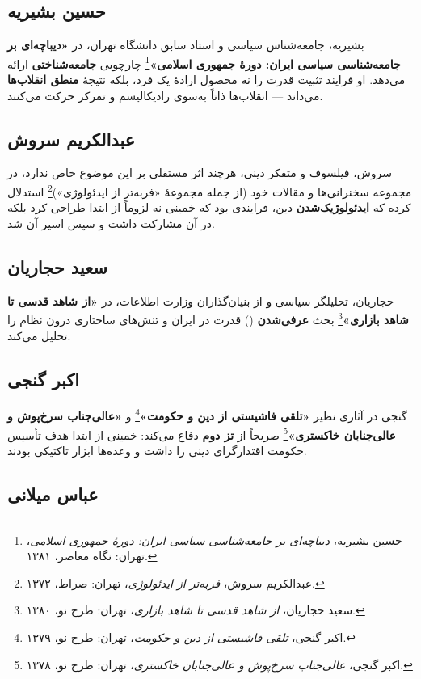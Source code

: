 \documentclass[12pt,a4paper]{book}
\newcommand{\keyword}[1]{\textbf{\textcolor{cPrimary}{#1}}}
\newcommand{\en}[1]{\lr{\textit{#1}}}
\begin{document}
\subsection{حسین بشیریه}

بشیریه، جامعه‌شناس سیاسی و استاد سابق دانشگاه تهران، در \textbf{«دیباچه‌ای بر جامعه‌شناسی سیاسی ایران: دورهٔ جمهوری اسلامی»}\footnote{حسین بشیریه، \textit{دیباچه‌ای بر جامعه‌شناسی سیاسی ایران: دورهٔ جمهوری اسلامی}، تهران: نگاه معاصر، ۱۳۸۱.} چارچوبی \keyword{جامعه‌شناختی} ارائه می‌دهد. او فرایند تثبیت قدرت را نه محصول ارادهٔ یک فرد، بلکه نتیجهٔ \keyword{منطق انقلاب‌ها} می‌داند — انقلاب‌ها ذاتاً به‌سوی رادیکالیسم و تمرکز حرکت می‌کنند.

\subsection{عبدالکریم سروش}

سروش، فیلسوف و متفکر دینی، هرچند اثر مستقلی بر این موضوع خاص ندارد، در مجموعه سخنرانی‌ها و مقالات خود (از جمله مجموعهٔ «فربه‌تر از ایدئولوژی»)\footnote{عبدالکریم سروش، \textit{فربه‌تر از ایدئولوژی}، تهران: صراط، ۱۳۷۲.} استدلال کرده که \keyword{ایدئولوژیک‌شدن} دین، فرایندی بود که خمینی نه لزوماً از ابتدا طراحی کرد بلکه در آن مشارکت داشت و سپس اسیر آن شد.

\subsection{سعید حجاریان}

حجاریان، تحلیلگر سیاسی و از بنیان‌گذاران وزارت اطلاعات، در \textbf{«از شاهد قدسی تا شاهد بازاری»}\footnote{سعید حجاریان، \textit{از شاهد قدسی تا شاهد بازاری}، تهران: طرح نو، ۱۳۸۰.} بحث \keyword{عرفی‌شدن} (\en{secularization}) قدرت در ایران و تنش‌های ساختاری درون نظام را تحلیل می‌کند.

\subsection{اکبر گنجی}

گنجی در آثاری نظیر \textbf{«تلقی فاشیستی از دین و حکومت»}\footnote{اکبر گنجی، \textit{تلقی فاشیستی از دین و حکومت}، تهران: طرح نو، ۱۳۷۹.} و \textbf{«عالی‌جناب سرخ‌پوش و عالی‌جنابان خاکستری»}\footnote{اکبر گنجی، \textit{عالی‌جناب سرخ‌پوش و عالی‌جنابان خاکستری}، تهران: طرح نو، ۱۳۷۸.} صریحاً از \keyword{تز دوم} دفاع می‌کند: خمینی از ابتدا هدف تأسیس حکومت اقتدارگرای دینی را داشت و وعده‌ها ابزار تاکتیکی بودند.

\subsection{عباس میلانی}
\end{document}
